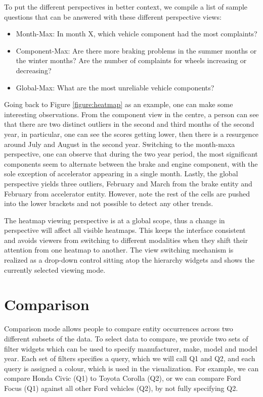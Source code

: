 To put the different perspectives in better context, we compile a list of sample 
questions that can be answered with these different perspective views:
\begin{itemize} [noitemsep]
  \item Month-Max: In month X, which vehicle component had the most complaints?
  \item Component-Max: Are there more braking problems in the summer months or
  the winter months? Are the number of complaints for wheels increasing or
  decreasing?
  \item Global-Max: What are the most unreliable vehicle components?
\end{itemize}

Going back to Figure \ref{figure:heatmap} as an example, one can make some
interesting observations. From the component view in the centre, a person can
see that there are two distinct outliers in the second and third months of the
second year, in particular, one can see the scores getting lower, then there is
a resurgence around July and August in the second year. Switching to the month-maxa
perspective, one can observe that during the two year period, the most
significant components seem to alternate between the brake and engine component,
with the sole exception of accelerator appearing in a single month. Lastly, the
global perspective yields three outliers, February and March from the brake entity
and February from accelerator entity. However, note the rest of the cells are
pushed into the lower brackets and not possible to detect any other trends.
 
The heatmap viewing perspective is at a global scope, thus a change in
perspective will affect all visible heatmaps. This keeps the interface
consistent and avoids viewers from switching to different modalities when they
shift their attention from one heatmap to another. The view switching mechanism
is realized as a drop-down control sitting atop the hierarchy widgets and shows
the currently selected viewing mode.



\section{Comparison}
Comparison mode allows people to compare entity occurrences across
two different subsets of the data. To select data to compare, we provide
two sets of filter widgets which can be used to specify manufacturer,
make, model and model year. Each set of filters specifies a query,
which we will call Q1 and Q2, and each query is assigned a colour,
which is used in the visualization. For example, we can compare
Honda Civic (Q1) to Toyota Corolla (Q2), or we can compare Ford
Focus (Q1) against all other Ford vehicles (Q2), by not fully specifying Q2.

